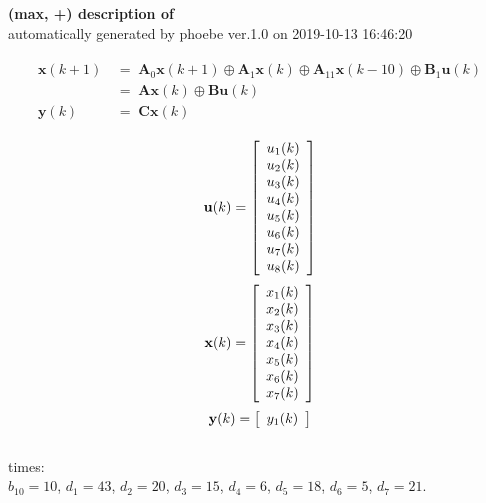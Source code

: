 \documentclass[11pt, a4paper, fleqn]{article}
\begin{document}
\noindent
\textbf{(max, +) description of} \texttt{\currfilebase} \\
automatically generated by phoebe ver.1.0 on 2019-10-13 16:46:20 

\begin{align}\begin{split}
\mathbf{x}(k+1) & \, = \; \mathbf{A}_{0}\mathbf{x}(k+1) \oplus \mathbf{A}_{1}\mathbf{x}(k) \oplus \mathbf{A}_{11}\mathbf{x}(k-10) \oplus \mathbf{B}_{1}\mathbf{u}(k)\\
& \, = \; \mathbf{Ax}(k) \oplus \mathbf{Bu}(k)\\
\mathbf{y}(k) & \, = \; \mathbf{Cx}(k)
\end{split}\end{align}

\begin{equation*}
\mathbf{u}(k) = 
\left[\begin{array}{*{20}c}
  u_1(k) \\
  u_2(k) \\
  u_3(k) \\
  u_4(k) \\
  u_5(k) \\
  u_6(k) \\
  u_7(k) \\
  u_8(k) \\
\end{array}\right]
\end{equation*}
\begin{equation*}
\mathbf{x}(k) = 
\left[\begin{array}{*{20}c}
  x_1(k) \\
  x_2(k) \\
  x_3(k) \\
  x_4(k) \\
  x_5(k) \\
  x_6(k) \\
  x_7(k) \\
\end{array}\right]
\end{equation*}
\begin{equation*}
\mathbf{y}(k) = 
\left[\begin{array}{*{20}c}
  y_1(k) \\
\end{array}\right]
\end{equation*}
\noindent\\
times:\\
$b_10 = 10$, $d_1 = 43$, $d_2 = 20$, $d_3 = 15$, $d_4 = 6$, $d_5 = 18$, $d_6 = 5$, $d_7 = 21$.\\
\end{document}
